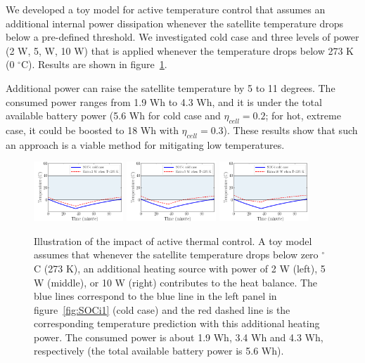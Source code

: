 \documentclass[]{aastex62}
\begin{document}
We developed a toy model for active temperature control that assumes an additional internal power 
dissipation whenever the satellite temperature drops below a pre-defined threshold. We investigated
cold case and three levels of power (2 W, 5, W, 10 W) that is applied whenever the temperature 
drops below 273 K (0 $^\circ$C). Results are shown in figure~\ref{fig:SOCi2}. 

Additional power can raise the satellite temperature by 5 to 11 degrees. The consumed power ranges
from 1.9 Wh to 4.3 Wh, and it is under the total available battery power (5.6 Wh for cold case and
$\eta_{cell}=0.2$; for hot, extreme case, it could be boosted to 18 Wh with $\eta_{cell}=0.3$). 
These results show that such an approach is a viable method for mitigating low temperatures.

\begin{figure}[t!]
\centering
\includegraphics[width=0.3\textwidth, keepaspectratio]{figures/TempsPlotCompare_SOCi-cold-heated2.png} 
\includegraphics[width=0.3\textwidth, keepaspectratio]{figures/TempsPlotCompare_SOCi-cold-heated5.png} 
\includegraphics[width=0.3\textwidth, keepaspectratio]{figures/TempsPlotCompare_SOCi-cold-heated10.png} 
\caption{Illustration of the impact of active thermal control. A toy model assumes that whenever the satellite temperature
drops below zero $^\circ$C (273 K), an additional heating source with power of 2 W (left),  5 W (middle), or 10 W (right) contributes
to the heat balance. The blue lines correspond to the blue line in the left panel in figure~\ref{fig:SOCi1} (cold case) and the 
red dashed line is the corresponding temperature prediction with this additional heating power. The consumed power is about 
1.9 Wh, 3.4 Wh and 4.3 Wh, respectively (the total available battery power is 5.6 Wh). 
\label{fig:SOCi2}}
\end{figure}
\end{document}
